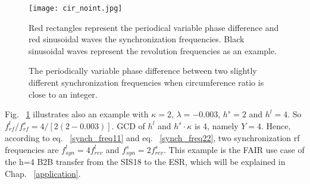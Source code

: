 
\begin{figure}[!htb]
   \centering   
   \texttt{[image: cir\_noint.jpg]}
   \caption{The periodically variable phase difference between two slightly different synchronization frequencies when circumference ratio is close to an integer.}{Red rectangles represent the periodical variable phase difference and red sinusoidal waves the synchronization frequencies. Black sinusoidal waves represent the revolution frequencies as an example.}
   \label{cir_noint}
\end{figure} 


Fig. ~\ref{cir_noint} illustrates also an example with $\kappa=2$, $\lambda=-0.003$, $h^s=2$ and $h^l=4$. So $f_{\mathit{rf}}^{l}/f_{\mathit{rf}}^{s}=4/[2(2-0.003)]$. GCD of $h^l$ and $h^s \cdot \kappa$ is 4, namely $Y=4$. Hence, according to eq. ~\ref{synch_freq11} and eq. ~\ref{synch_freq22}, two synchronization rf frequencies are $f_{\mathit{syn}}^{l}=4f_{\mathit{rev}}^{l}$ and $f_{\mathit{syn}}^{s}=2f_{\mathit{rev}}^{s}$. This example is the FAIR use case of the h=4 B2B transfer from the SIS18 to the ESR, which will be explained in Chap. ~\ref{application}. 

